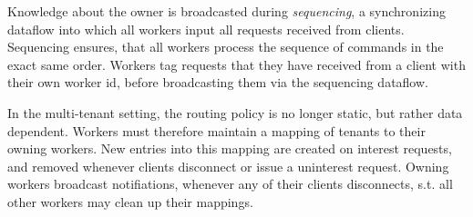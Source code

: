 \documentclass[../index.tex]{subfiles}
\begin{document}
Knowledge about the owner is broadcasted during \emph{sequencing}, a
synchronizing dataflow into which all workers input all requests
received from clients. Sequencing ensures, that all workers process
the sequence of commands in the exact same order. Workers tag requests
that they have received from a client with their own worker id, before
broadcasting them via the sequencing dataflow.

In the multi-tenant setting, the routing policy is no longer static,
but rather data dependent. Workers must therefore maintain a mapping
of tenants to their owning workers. New entries into this mapping are
created on interest requests, and removed whenever clients disconnect
or issue a uninterest request. Owning workers broadcast notifiations,
whenever any of their clients disconnects, s.t. all other workers may
clean up their mappings.
\end{document}
